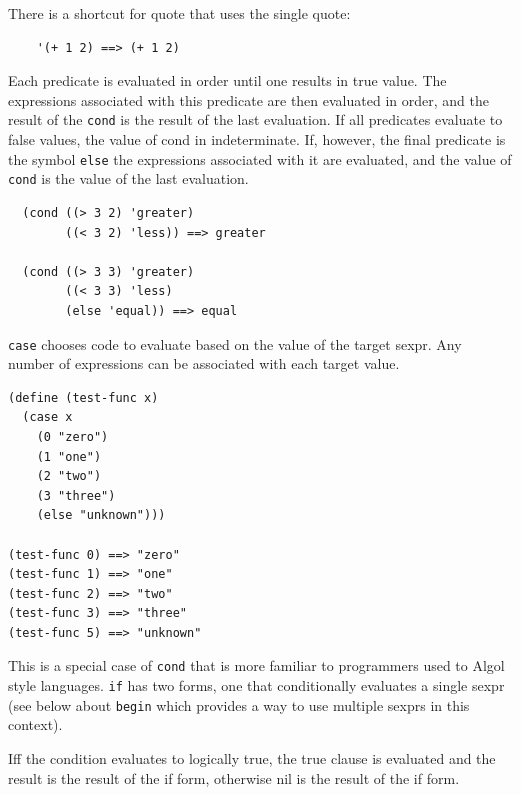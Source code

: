 \documentclass[12pt]{article}
\begin{document}
There is a shortcut for quote that uses the single quote:

\begin{verbatim}
    '(+ 1 2) ==> (+ 1 2)
\end{verbatim}


Each predicate is evaluated in order until one results in true value.
The expressions associated with this predicate are then evaluated in order,
and the result of the \verb|cond| is the result of the last
evaluation. If all predicates evaluate to false values, the value of
cond in indeterminate. If, however, the final predicate is the symbol
\verb|else| the expressions associated with it are evaluated, and the
value of \verb|cond| is the value of the last evaluation.

\begin{verbatim}
  (cond ((> 3 2) 'greater)
        ((< 3 2) 'less)) ==> greater

  (cond ((> 3 3) 'greater)
        ((< 3 3) 'less)
        (else 'equal)) ==> equal
\end{verbatim}


\verb|case| chooses code to evaluate based on the value of the target
sexpr. Any number of expressions can be associated with each target value.

\begin{verbatim}
(define (test-func x)
  (case x
    (0 "zero")
    (1 "one")
    (2 "two")
    (3 "three")
    (else "unknown")))

(test-func 0) ==> "zero"
(test-func 1) ==> "one"
(test-func 2) ==> "two"
(test-func 3) ==> "three"
(test-func 5) ==> "unknown"
\end{verbatim}


This is a special case of \verb|cond| that is more familiar to
programmers used to Algol style languages. \verb|if| has two forms,
one that conditionally evaluates a single sexpr (see below about
\verb|begin| which provides a way to use multiple sexprs in this context).

Iff the condition evaluates to logically true, the true clause is
evaluated and the result is the result of the if form, otherwise nil
is the result of the if form.
\end{document}
